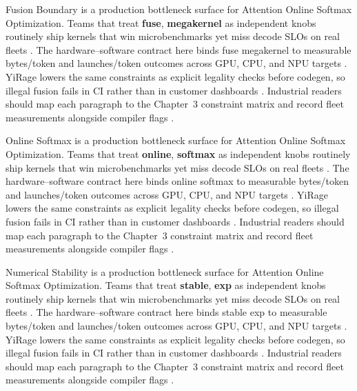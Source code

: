 Fusion Boundary is a production bottleneck surface for Attention Online Softmax Optimization. Teams that treat \textbf{fuse}, \textbf{megakernel} as independent knobs routinely ship kernels that win microbenchmarks yet miss decode SLOs on real fleets \citep{nvidia2022hopper,amd2024aie}. The hardware--software contract here binds fuse megakernel to measurable bytes/token and launches/token outcomes across GPU, CPU, and NPU targets \citep{semianalysis2024tma,dlbook}. YiRage lowers the same constraints as explicit legality checks before codegen, so illegal fusion fails in CI rather than in customer dashboards \citep{amd2024xdna,dao2022flashattention}. Industrial readers should map each paragraph to the Chapter~3 constraint matrix and record fleet measurements alongside compiler flags \citep{amd2024aie,kwon2023vllm}.

Online Softmax is a production bottleneck surface for Attention Online Softmax Optimization. Teams that treat \textbf{online}, \textbf{softmax} as independent knobs routinely ship kernels that win microbenchmarks yet miss decode SLOs on real fleets \citep{taxbreak2026,semianalysis2024tma}. The hardware--software contract here binds online softmax to measurable bytes/token and launches/token outcomes across GPU, CPU, and NPU targets \citep{memoryfloor2026,amd2024xdna}. YiRage lowers the same constraints as explicit legality checks before codegen, so illegal fusion fails in CI rather than in customer dashboards \citep{nvidia2022hopper,amd2024aie}. Industrial readers should map each paragraph to the Chapter~3 constraint matrix and record fleet measurements alongside compiler flags \citep{semianalysis2024tma,dlbook}.

Numerical Stability is a production bottleneck surface for Attention Online Softmax Optimization. Teams that treat \textbf{stable}, \textbf{exp} as independent knobs routinely ship kernels that win microbenchmarks yet miss decode SLOs on real fleets \citep{memoryfloor2026,amd2024xdna}. The hardware--software contract here binds stable exp to measurable bytes/token and launches/token outcomes across GPU, CPU, and NPU targets \citep{nvidia2022hopper,amd2024aie}. YiRage lowers the same constraints as explicit legality checks before codegen, so illegal fusion fails in CI rather than in customer dashboards \citep{semianalysis2024tma,dlbook}. Industrial readers should map each paragraph to the Chapter~3 constraint matrix and record fleet measurements alongside compiler flags \citep{amd2024xdna,dao2022flashattention}.

